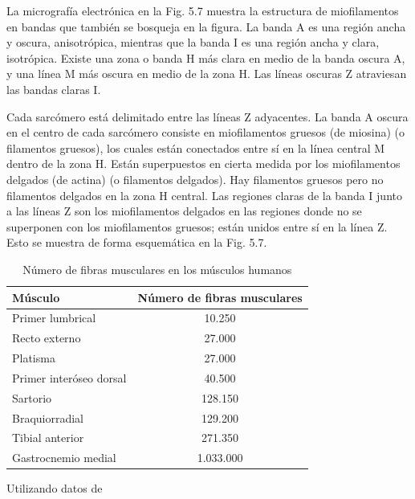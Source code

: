 \documentclass[12pt]{book}
\begin{document}
La micrografía electrónica en la Fig. 5.7 muestra la estructura de miofilamentos en bandas que también se bosqueja en la figura. La banda A es una región ancha y oscura, anisotrópica, mientras que la banda I es una región ancha y clara, isotrópica. Existe una zona o banda H más clara en medio de la banda oscura A, y una línea M más oscura en medio de la zona H. Las líneas oscuras Z atraviesan las bandas claras I.

Cada sarcómero está delimitado entre las líneas Z adyacentes. La banda A oscura en el centro de cada sarcómero consiste en miofilamentos gruesos (de miosina) (o filamentos gruesos), los cuales están conectados entre sí en la línea central M dentro de la zona H. Están superpuestos en cierta medida por los miofilamentos delgados (de actina) (o filamentos delgados). Hay filamentos gruesos pero no filamentos delgados en la zona H central. Las regiones claras de la banda I junto a las líneas Z son los miofilamentos delgados en las regiones donde no se superponen con los miofilamentos gruesos; están unidos entre sí en la línea Z. Esto se muestra de forma esquemática en la Fig. 5.7.


\begin{table}[htbp]
\centering
\caption{Número de fibras musculares en los músculos humanos}
\label{tab:55}
\begin{tabularx}{0.6\textwidth}{Xc}
\toprule
\textbf{Músculo} & \textbf{Número de fibras musculares} \\
\midrule
Primer lumbrical & 10.250 \\
Recto externo & 27.000 \\
Platisma & 27.000 \\
Primer interóseo dorsal & 40.500 \\
Sartorio & 128.150 \\
Braquiorradial & 129.200 \\
Tibial anterior & 271.350 \\
Gastrocnemio medial & 1.033.000 \\
\bottomrule
\end{tabularx}
\begin{flushleft}
    \small Utilizando datos de \cite{52}
\end{flushleft}
\end{table}
\end{document}
